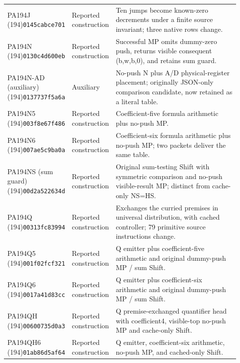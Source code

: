 \begin{longtable}{@{}p{0.24\linewidth}p{0.14\linewidth}p{0.56\linewidth}@{}}
PA194J (194)\newline\texttt{0145cabce701} & Reported construction & Ten jumps become known-zero decrements under a finite source invariant; three native rows change.\\[4pt]
PA194N (194)\newline\texttt{0130c4d600eb} & Reported construction & Successful MP omits dummy-zero push, returns visible consequent (b,w,b,0), and retains sum guard.\\[4pt]
PA194N-AD (auxiliary) (194)\newline\texttt{0137737f5a6a} & Auxiliary & No-push N plus A/D physical-register placement; originally JSON-only comparison candidate, now retained as a literal table.\\[4pt]
PA194N5 (194)\newline\texttt{003f8e67f486} & Reported construction & Coefficient-five formula arithmetic plus no-push MP.\\[4pt]
PA194N6 (194)\newline\texttt{007ae5c9ba0a} & Reported construction & Coefficient-six formula arithmetic plus no-push MP; two packets deliver the same table.\\[4pt]
PA194NS (sum guard) (194)\newline\texttt{00d2a522634d} & Reported construction & Original sum-testing Shift with symmetric comparison and no-push visible-result MP; distinct from cache-only NS=HS.\\[4pt]
PA194Q (194)\newline\texttt{00313fc83994} & Reported construction & Exchanges the curried premises in universal distribution, with cached controller; 79 primitive source instructions change.\\[4pt]
PA194Q5 (194)\newline\texttt{001f02fcf321} & Reported construction & Q emitter plus coefficient-five arithmetic and original dummy-push MP / sum Shift.\\[4pt]
PA194Q6 (194)\newline\texttt{0017a41d83cc} & Reported construction & Q emitter plus coefficient-six arithmetic and original dummy-push MP / sum Shift.\\[4pt]
PA194QH (194)\newline\texttt{00600735d0a3} & Reported construction & Q premise-exchanged quantifier head with coefficient4, visible-top no-push MP and cache-only Shift.\\[4pt]
PA194QH6 (194)\newline\texttt{01ab86d5af64} & Reported construction & Q emitter, coefficient-six arithmetic, no-push MP, and cached-only Shift.\\[4pt]

\end{longtable}
